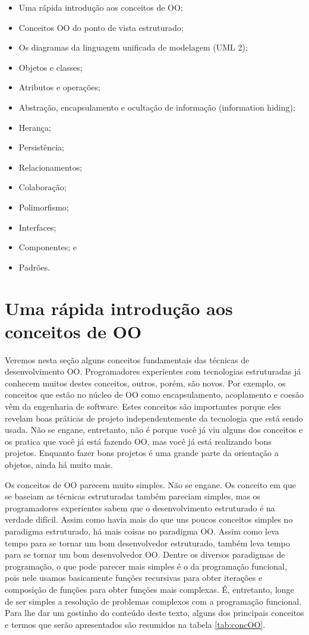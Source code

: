 \documentclass[
	11pt,				%
	openright,
	twoside,			%
	a4paper,			%
	english,			%
	french,
	brazil,				%
	sumario=tradicional
	]{abntex2}
\begin{document}
\begin{itemize}
\item Uma rápida introdução aos conceitos de OO;
\item Conceitos OO do ponto de vista estruturado;
\item Os diagramas da linguagem unificada de modelagem (UML 2);
\item Objetos e classes;
\item Atributos e operações;
\item Abstração, encapsulamento e ocultação de informação (information hiding);
\item Herança;
\item Persistência;
\item Relacionamentos;
\item Colaboração;
\item Polimorfismo;
\item Interfaces;
\item Componentes; e
\item Padrões.
\end{itemize}

\section{Uma rápida introdução aos conceitos de OO}

Veremos nesta seção alguns conceitos fundamentais das técnicas de desenvolvimento OO. Programadores experientes com tecnologias estruturadas já conhecem muitos destes conceitos, outros, porém, são novos. Por exemplo, os conceitos que estão no núcleo de OO como encapsulamento, acoplamento e coesão vêm da engenharia de software. Estes conceitos são importantes porque eles revelam boas práticas de projeto independentemente da tecnologia que está sendo usada. Não se engane, entretanto, não é porque você já viu alguns dos conceitos e os pratica que você já está fazendo OO, mas você já está realizando bons projetos. Enquanto fazer bons projetos é uma grande parte da orientação a objetos, ainda há muito mais.

Os conceitos de OO parecem muito simples. Não se engane. Os conceito em que se baseiam as técnicas estruturadas também pareciam simples, mas os programadores experientes sabem que o desenvolvimento estruturado é na verdade difícil. Assim como havia mais do que uns poucos conceitos simples no paradigma estruturado, há mais coisas no paradigma OO. Assim como leva tempo para se tornar um bom desenvolvedor estruturado, também leva tempo para se tornar um bom desenvolvedor OO. Dentre os diversos paradigmas de programação, o que pode parecer mais simples é o da programação funcional, pois nele usamos basicamente funções recursivas para obter iterações e composição de funções para obter funções mais complexas. É, entretanto, longe de ser simples a resolução de problemas complexos com a programação funcional. Para lhe dar um gostinho do conteúdo deste texto, alguns dos principais conceitos e termos que serão apresentados são resumidos na tabela \ref{tab:concOO}.
\end{document}
